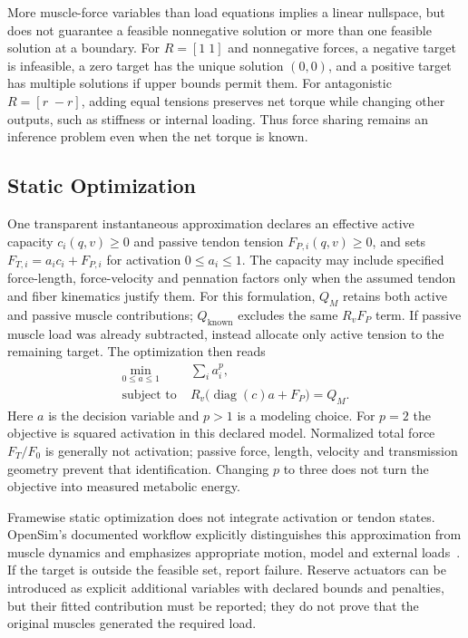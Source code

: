 More muscle-force variables than load equations implies a linear nullspace,
but does not guarantee a feasible nonnegative solution or more than one
feasible solution at a boundary. For $R=[1\;1]$ and nonnegative forces,
a negative target is infeasible, a zero target has the unique solution $(0,0)$,
and a positive target has multiple solutions if upper bounds permit them.
For antagonistic $R=[r\;-r]$, adding equal tensions preserves net torque while
changing other outputs, such as stiffness or internal loading.
Thus force sharing remains an inference problem even when the net torque is known.

\subsection{Static Optimization}

One transparent instantaneous approximation declares an effective active
capacity $c_i(q,v)\geq0$ and passive tendon tension $F_{P,i}(q,v)\geq0$, and sets
$F_{T,i}=a_i c_i+F_{P,i}$ for activation $0\leq a_i\leq1$.
The capacity may include specified force-length, force-velocity and pennation
factors only when the assumed tendon and fiber kinematics justify them.
For this formulation, $Q_M$ retains both active and passive muscle contributions;
$Q_{\mathrm{known}}$ excludes the same $R_vF_P$ term. If passive muscle load
was already subtracted, instead allocate only active tension to the remaining
target. The optimization then reads
\begin{equation}
 \begin{aligned}
 \min_{0\leq a\leq1}\;&\sum_i a_i^p,\\
 \text{subject to}\;&R_v\bigl(\operatorname{diag}(c)a+F_P\bigr)=Q_M.
 \end{aligned}
 \label{eq:ch6:static-opt}
\end{equation}
Here $a$ is the decision variable and $p>1$ is a modeling choice.
For $p=2$ the objective is squared activation in this declared model.
Normalized total force $F_T/F_0$ is generally not activation; passive force,
length, velocity and transmission geometry prevent that identification.
Changing $p$ to three does not turn the objective into measured metabolic energy.

Framewise static optimization does not integrate activation or tendon states.
OpenSim's documented workflow explicitly distinguishes this approximation from
muscle dynamics and emphasizes appropriate motion, model and external loads~\cite{OpenSimSOBiological}.
If the target is outside the feasible set, report failure. Reserve actuators can
be introduced as explicit additional variables with declared bounds and
penalties, but their fitted contribution must be reported; they do not prove
that the original muscles generated the required load.

